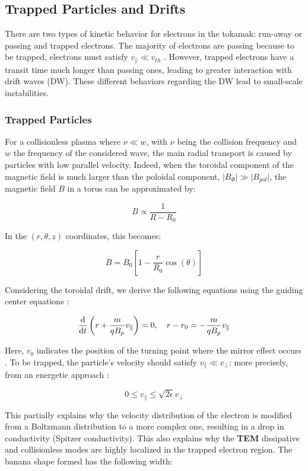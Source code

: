 \documentclass[11pt,a4paper,openany]{report}
\begin{document}
\begin{multicols}{2}
    \subsection{Trapped Particles and Drifts}

    There are two types of kinetic behavior for electrons in the tokamak: run-away or passing and trapped electrons. The majority of electrons are passing because to be trapped, electrons must satisfy $v_\parallel \ll v_{th}$ \cite{book_banana}\cite{Banana_distr_runaway}. However, trapped electrons have a transit time much longer than passing ones, leading to greater interaction with drift waves (DW). These different behaviors regarding the DW lead to small-scale instabilities.

    \subsubsection{Trapped Particles}

    For a collisionless plasma where $\nu \ll w$, with $\nu$ being the collision frequency and $w$ the frequency of the considered wave, the main radial transport is caused by particles with low parallel velocity. Indeed, when the toroidal component of the magnetic field is much larger than the poloidal component, $\vert B_\Phi \vert \gg \vert B_{pol} \vert$, the magnetic field $B$ in a torus can be approximated by:

    $$
        B \propto \frac{1}{R - R_0}
    $$

    In the $(r, \theta, z)$ coordinates, this becomes:

    $$
        B = B_0\left[1 - \frac{r}{R_0}\cos(\theta)\right]
    $$

    Considering the toroidal drift, we derive the following equations using the guiding center equations \cite{book_banana}:

    $$
        \dv{t}\left(r + \frac{m}{qB_p}v_\parallel\right) = 0, \quad r - r_0 = -\frac{m}{qB_p}v_\parallel
    $$

    Here, $r_0$ indicates the position of the turning point where the mirror effect occurs \cite{TEM_mirror_localization}. To be trapped, the particle's velocity should satisfy $v_\parallel \ll v_\perp$; more precisely, from an energetic approach \cite{TEM_slow}:

    $$
        0 \leq v_\parallel \leq \sqrt{2\epsilon} v_\perp
    $$

    This partially explains why the velocity distribution of the electron \cite{TEM_slow,Banana_distr_runaway} is modified from a Boltzmann distribution to a more complex one, resulting in a drop in conductivity (Spitzer conductivity). This also explains why the \textbf{TEM} dissipative and collisionless modes are highly localized in the trapped electron region. The banana shape formed has the following width:


\end{multicols}
\end{document}
